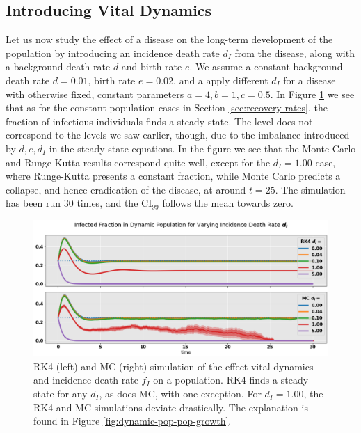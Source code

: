 \documentclass[]{article}
\begin{document}
\subsection{Introducing Vital Dynamics} \label{sec:vital-dynamics}

Let us now study the effect of a disease on the long-term development of the population by introducing an incidence death rate $d_I$ from the disease, along with a background death rate $d$ and birth rate $e$. We assume a constant background death rate $d=0.01$, birth rate $e=0.02$, and a apply different $d_I$ for a disease with otherwise fixed, constant parameters $a=4, b=1, c=0.5$. In Figure \ref{fig:dynamic-pop-infected-ratio} we see that as for the constant population cases in Section \ref{sec:recovery-rates}, the fraction of infectious individuals finds a steady state. The level does not correspond to the levels we saw earlier, though, due to the imbalance introduced by $d, e, d_I$ in the steady-state equations. In the figure we see that the Monte Carlo and Runge-Kutta results correspond quite well, except for the $d_I = 1.00$ case, where Runge-Kutta presents a constant fraction, while Monte Carlo predicts a collapse, and hence eradication of the disease, at around $t=25$. The simulation has been run 30 times, and the CI$_{99}$ follows the mean towards zero.



\begin{figure}[!h]
	\centering
	\includegraphics[width=1\linewidth]{./figs/dynamic-pop-infected-ratio.png}
	\caption{RK4 (left) and MC (right) simulation of the effect vital dynamics and incidence death rate $f_I$ on a population. RK4 finds a steady state for any $d_I$, as does MC, with one exception. For $d_I = 1.00$, the RK4 and MC simulations deviate drastically. The explanation is found in Figure \ref{fig:dynamic-pop-pop-growth}.}
	\label{fig:dynamic-pop-infected-ratio}
\end{figure}
\end{document}

